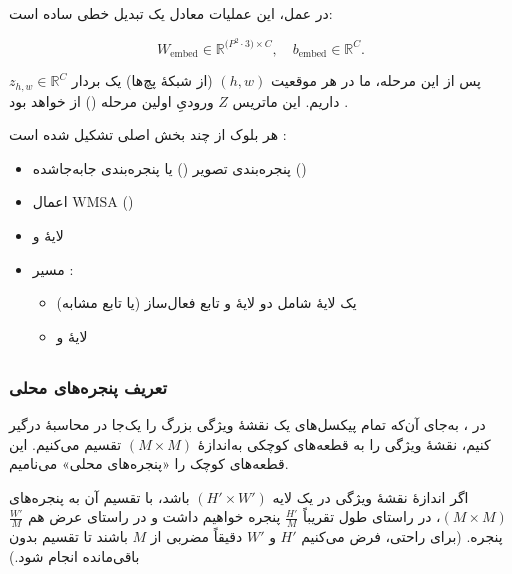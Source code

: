 در عمل، این عملیات معادل یک تبدیل خطی ساده است:

\[
W_{\text{embed}} \in \mathbb{R}^{\bigl(P^2 \cdot 3\bigr) \times C},
\quad
b_{\text{embed}} \in \mathbb{R}^{C}.
\]

پس از این مرحله، ما در هر موقعیت \((h, w)\) (از شبکهٔ پچ‌ها) یک بردار 
\(\displaystyle z_{h,w} \in \mathbb{R}^{C}\) داریم. این ماتریس \(\displaystyle Z\) 
ورودیِ اولین مرحله () از  خواهد بود \cite{liu2021swintransformer}.

هر بلوک  از چند بخش اصلی تشکیل شده است \cite{liu2021swintransformer}:
\begin{itemize}
	\item پنجره‌بندی تصویر (\textbf{}) 
	یا پنجره‌بندی جابه‌جاشده (\textbf{})
	\item اعمال \(\mathrm{WMSA}\) (\textbf{})
	\item لایهٔ \textbf{} و \textbf{}
	\item مسیر \textbf{}:
	\begin{itemize}
		\item یک لایهٔ  شامل دو لایهٔ \textbf{} 
		و تابع فعال‌ساز \textbf{} (یا تابع مشابه)
		\item لایهٔ \textbf{} و \textbf{}
	\end{itemize}
\end{itemize}



\subsection{}

\subsubsection{تعریف پنجره‌های محلی}

در ، به‌جای آن‌که تمام پیکسل‌های یک نقشهٔ ویژگی بزرگ را یک‌جا 
در محاسبهٔ  درگیر کنیم، نقشهٔ ویژگی را به قطعه‌های کوچکی به‌اندازهٔ 
\(\displaystyle (M \times M)\) تقسیم می‌کنیم. این قطعه‌های کوچک را 
«پنجره‌های محلی» می‌نامیم.

اگر اندازهٔ نقشهٔ ویژگی در یک لایه 
\(\displaystyle (H' \times W')\) باشد، 
با تقسیم آن به پنجره‌های 
\(\displaystyle (M \times M)\)، 
در راستای طول تقریباً 
\(\displaystyle \tfrac{H'}{M}\) پنجره خواهیم داشت 
و در راستای عرض هم 
\(\displaystyle \tfrac{W'}{M}\) پنجره.
(برای راحتی، فرض می‌کنیم 
\(\displaystyle H'\) و \(\displaystyle W'\) 
دقیقاً مضربی از \(\displaystyle M\) باشند 
تا تقسیم بدون باقی‌مانده انجام شود.)

